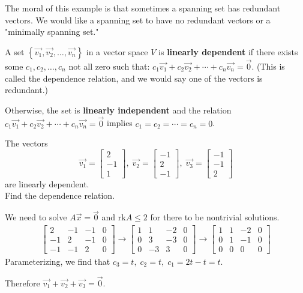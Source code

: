 \documentclass[../main.tex]{subfiles}
\begin{document}
The moral of this example is that sometimes a spanning set has redundant vectors.
We would like a spanning set to have no redundant vectors or a "minimally spanning set."

\begin{definition}
    A set \( \left\{ \vec{v_1}, \vec{v_2}, \dots, \vec{v_n} \right\} \) in a vector space \( V \) is \textbf{linearly dependent}
    if there exists some \( c_1, c_2, \dots, c_n \) not all zero such that:
    \( c_1\vec{v_1} + c_2\vec{v_2} + \cdots + c_n\vec{v_n} = \vec{0} \).
    (This is called the dependence relation, and we would say one of the vectors is redundant.)

    Otherwise, the set is \textbf{linearly independent} and the relation \( c_1\vec{v_1} + c_2\vec{v_2} + \cdots + c_n\vec{v_n} = \vec{0} \)
    implies \( c_1 = c_2 = \cdots = c_n = 0\).
\end{definition}

\begin{example}[]
    The vectors \[\vec{v_1} = \begin{bmatrix} 2 \\ -1 \\ 1 \end{bmatrix},
    \; \vec{v_2} = \begin{bmatrix} -1 \\ 2 \\ -1 \end{bmatrix},
    \; \vec{v_3} = \begin{bmatrix} -1 \\ -1 \\ 2 \end{bmatrix} \] are linearly dependent. \\
    Find the dependence relation.

    We need to solve \( A\vec{x} = \vec{0} \) and \( \text{rk}A \leq 2 \) for there to be nontrivial solutions.
    \begin{gather*}
        \begin{bmatrix}
            2 & -1 & -1 & 0 \\
            -1 & 2 & -1 & 0 \\
            -1 & -1 & 2 & 0
        \end{bmatrix}
        \rightarrow
        \begin{bmatrix}
            1 & 1 & -2 & 0 \\
            0 & 3 & -3 & 0 \\
            0 & -3 & 3 & 0
        \end{bmatrix}
        \rightarrow
        \begin{bmatrix}
            1 & 1 & -2 & 0 \\
            0 & 1 & -1 & 0 \\
            0 & 0 & 0 & 0
        \end{bmatrix}
    \end{gather*}
    Parameterizing, we find that \( c_3 = t, \; c_2 = t, \; c_1 = 2t-t = t \).

    Therefore \( \boxed{\vec{v_1}+\vec{v_2}+\vec{v_3} = \vec{0}} \).
\end{example}
\end{document}
